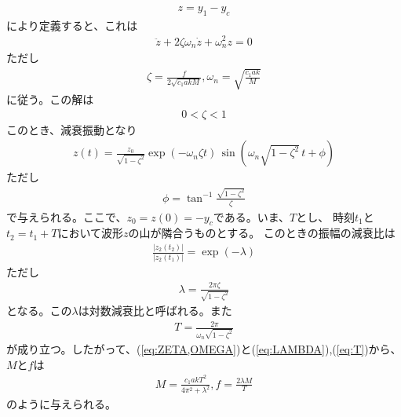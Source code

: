 \documentclass[a4j,11pt,twoside]{ujbook}
\begin{document}
\begin{eqnarray}
	z = y_1 - y_c
\end{eqnarray}
により定義すると、これは
\begin{eqnarray}
	\ddot{z} + 2\zeta\omega_n\dot{z} + \omega_n^2z = 0
\end{eqnarray}
ただし
\begin{eqnarray}
\zeta = \frac{f}{2\sqrt{c_1akM}} , \omega_n = \sqrt{\frac{c_1ak}{M}}
\label{eq:ZETA,OMEGA}
\end{eqnarray}
に従う。この解は
\begin{eqnarray}
	0 < \zeta < 1
\end{eqnarray}
このとき、減衰振動となり
\begin{eqnarray}
	z(t) = \frac{z_0}{\sqrt{1-\zeta^2}}\exp(-\omega_n\zeta
	t)\,\sin(\omega_n\sqrt{1-\zeta^2}\,t+\phi)
\end{eqnarray}
ただし
\begin{eqnarray}
	\phi = \tan^{-1}{\frac{\sqrt{1-\zeta^2}}{\zeta}}
\end{eqnarray}
で与えられる。ここで、$z_0 = z(0) = -y_c$である。いま、$T$とし、
時刻$t_1$と$t_2 = t_1 + T$において波形$z$の山が隣合うものとする。
このときの振幅の減衰比は
\begin{eqnarray}
	\frac{|z_2(t_2)|}{|z_2(t_1)|} = \exp(-\lambda)
\end{eqnarray}
ただし
\begin{eqnarray}
\lambda = \frac{2\pi\zeta}{\sqrt{1-\zeta^2}}
\label{eq:LAMBDA}
\end{eqnarray}
となる。この$\lambda$は対数減衰比と呼ばれる。また
\begin{eqnarray}
T = \frac{2\pi}{\omega_n\sqrt{1-\zeta^2}}
\label{eq:T}
\end{eqnarray}
が成り立つ。したがって、(\ref{eq:ZETA,OMEGA})と(\ref{eq:LAMBDA}),(\ref{eq:T})から、$M$と$f$は
\begin{eqnarray}
M = \frac{c_1akT^2}{4\pi^2 + \lambda^2},f = \frac{2\lambda M}{T}
\label{M,f}
\end{eqnarray}
のように与えられる。
\end{document}
